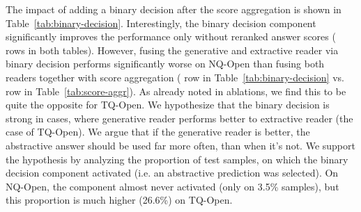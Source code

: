 \documentclass[11pt]{article}
\begin{document}
The impact of adding a binary decision after the score aggregation is shown in Table~\ref{tab:binary-decision}. 
Interestingly, the binary decision component significantly improves the performance only without reranked answer scores ( rows in both tables). 
However, fusing the generative and extractive reader via binary decision performs significantly worse on NQ-Open than fusing both readers together with score aggregation ( row in Table~\ref{tab:binary-decision} vs.  row in Table~\ref{tab:score-aggr}). As already noted in ablations, we find this to be quite the opposite for TQ-Open. We hypothesize that the binary decision is strong in cases, where generative reader performs better to extractive reader (the case of TQ-Open). We argue that if the generative reader is better, the abstractive answer should be used far more often, than when it's not.
We support the hypothesis by analyzing the proportion of test samples, on which the binary decision component activated (i.e. an abstractive prediction was selected). On NQ-Open, the component almost never activated (only on 3.5\% samples), but this proportion is much higher (26.6\%) on TQ-Open. 

\begin{table}[t]
    \centering
\caption{Comparison between ensembling via posterior averaging and score aggregation on NQ-Open.}
    \label{fig:reader_ensemble}
\end{table}
\end{document}
